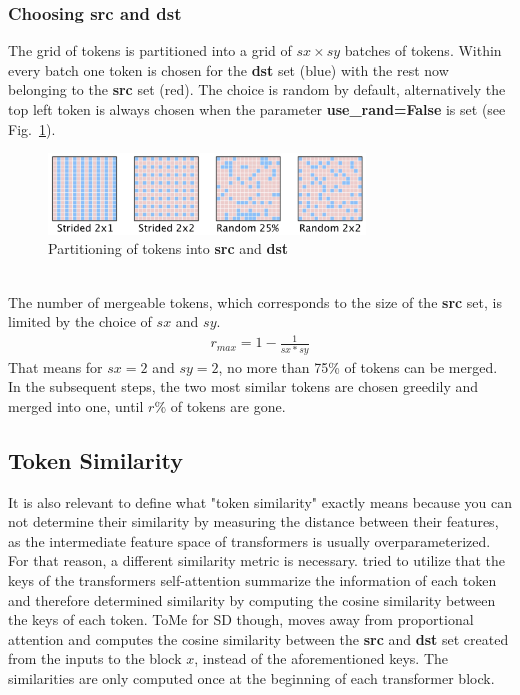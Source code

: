 \subsubsection*{Choosing src and dst}
The grid of tokens is partitioned into a grid of \(sx \times sy\) batches of tokens.
Within every batch one token is chosen for the \textbf{dst} set (blue) with the rest now belonging to the \textbf{src} set (red). The choice is random by default, alternatively the top left token is always chosen when the parameter \textbf{use\_rand=False} is set (see Fig.~\ref{fig:src-dst}).
\begin{figure}[!htb]
\centering
\includegraphics[width=0.75\textwidth]
{static/src_dst_part.png}
\caption{Partitioning of tokens into \textbf{src} and \textbf{dst} \cite[Fig. 5]{bolya2023tome}}
\label{fig:src-dst}
\end{figure}\\
The number of mergeable tokens, which corresponds to the size of the \textbf{src} set, is limited by the choice of \(sx\) and \(sy\).
\begin{align*}
    r_{max} = 1-\frac{1}{sx*sy}
\end{align*}
That means for \(sx = 2\) and \(sy = 2\), no more than 75\% of tokens can be merged.\\
In the subsequent steps, the two most similar tokens are chosen greedily and merged into one, until \(r\%\) of tokens are gone.



\subsection{Token Similarity}
It is also relevant to define what "token similarity" exactly means because you can not determine their similarity by measuring the distance between their features, as the intermediate feature space of transformers is usually overparameterized.
For that reason, a different similarity metric is necessary. \cite{bolya2023tome} tried to utilize that the keys of the transformers self-attention summarize the information of each token and therefore determined similarity by computing the cosine similarity between the keys of each token. ToMe for SD though, moves away from proportional attention and computes the cosine similarity between the \textbf{src} and \textbf{dst} set created from the inputs to the block \(x\), instead of the aforementioned keys. The similarities are only computed once at the beginning of each transformer block.



